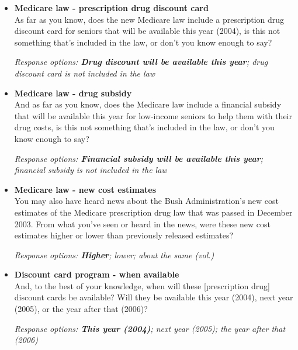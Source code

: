 \documentclass[12pt, letterpaper]{article}
\begin{document}
\begin{itemize} \item \textbf{Medicare law - prescription drug discount card}\\
As far as you know, does the new Medicare law include a prescription drug discount card for seniors that will be available this year (2004), is this not something that's included in the law, or don't you know enough to say?

\textit{Response options: \textbf{Drug discount will be available this year}; drug discount card is not included in the law} 
\end{itemize}

\begin{itemize} \item \textbf{Medicare law - drug subsidy}\\
And as far as you know, does the Medicare law include a financial subsidy that will be available this year for low-income seniors to help them with their drug costs, is this not something that's included in the law, or don't you know enough to say?

\textit{Response options: \textbf{Financial subsidy will be available this year}; financial subsidy is not included in the law} 
\end{itemize}

\begin{itemize} \item \textbf{Medicare law - new cost estimates}\\
You may also have heard news about the Bush Administration's new cost estimates of the Medicare prescription drug law that was passed in December 2003. From what you've seen or heard in the news, were these new cost estimates higher or lower than previously released estimates? 

\textit{Response options: \textbf{Higher}; lower; about the same (vol.)} 
\end{itemize}

\begin{itemize} \item \textbf{Discount card program - when available}\\
And, to the best of your knowledge, when will these [prescription drug] discount cards be available? Will they be available this year (2004), next year (2005), or the year after that (2006)? 

\textit{Response options: \textbf{This year (2004)}; next year (2005); the year after that (2006)} 
\end{itemize}
\end{document}
